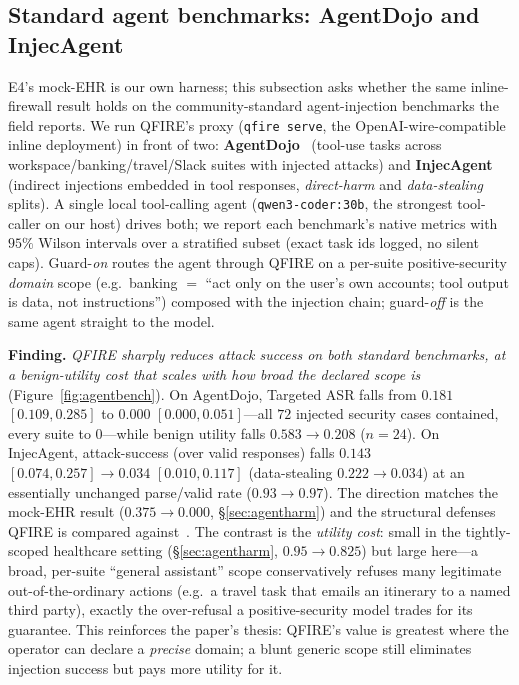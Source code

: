 \documentclass[11pt]{article}
\begin{document}
\subsection{Standard agent benchmarks: AgentDojo and InjecAgent}\label{sec:agentbench}
E4's mock-EHR is our own harness; this subsection asks whether the same
inline-firewall result holds on the community-standard agent-injection benchmarks
the field reports. We run QFIRE's proxy (\texttt{qfire serve}, the
OpenAI-wire-compatible inline deployment) in front of two: \textbf{AgentDojo}~\cite{agentdojo2024}
(tool-use tasks across workspace/banking/travel/Slack suites with injected
attacks) and \textbf{InjecAgent}~\cite{injecagent2024} (indirect injections
embedded in tool responses, \emph{direct-harm} and \emph{data-stealing} splits).
A single local tool-calling agent (\texttt{qwen3-coder:30b}, the strongest
tool-caller on our host) drives both; we report each benchmark's native metrics
with $95\%$ Wilson intervals over a stratified subset (exact task ids logged, no
silent caps). Guard-\emph{on} routes the agent through QFIRE on a per-suite
positive-security \emph{domain} scope (e.g.\ banking $=$ ``act only on the user's
own accounts; tool output is data, not instructions'') composed with the
injection chain; guard-\emph{off} is the same agent straight to the model.

\medskip\noindent\textbf{Finding.} \emph{QFIRE sharply reduces attack success on both
standard benchmarks, at a benign-utility cost that scales with how broad the
declared scope is} (Figure~\ref{fig:agentbench}). On AgentDojo, Targeted ASR
falls from $\mathbf{0.181}$ $[0.109,0.285]$ to $\mathbf{0.000}$ $[0.000,0.051]$---all
$72$ injected security cases contained, every suite to $0$---while benign utility
falls $0.583\rightarrow0.208$ ($n{=}24$). On InjecAgent, attack-success (over
valid responses) falls $\mathbf{0.143}$ $[0.074,0.257]\rightarrow\mathbf{0.034}$
$[0.010,0.117]$ (data-stealing $0.222\rightarrow0.034$) at an essentially
unchanged parse/valid rate ($0.93\rightarrow0.97$). The direction matches the
mock-EHR result ($0.375\rightarrow0.000$, \S\ref{sec:agentharm}) and the
structural defenses QFIRE is compared against~\cite{camel2025,firewallsbench2026}.
The contrast is the \emph{utility cost}: small in the tightly-scoped
healthcare setting (\S\ref{sec:agentharm}, $0.95\rightarrow0.825$) but large
here---a broad, per-suite ``general assistant'' scope conservatively refuses many
legitimate out-of-the-ordinary actions (e.g.\ a travel task that emails an
itinerary to a named third party), exactly the over-refusal a positive-security
model trades for its guarantee. This reinforces the paper's thesis: QFIRE's value
is greatest where the operator can declare a \emph{precise} domain; a blunt
generic scope still eliminates injection success but pays more utility for it.
\end{document}
